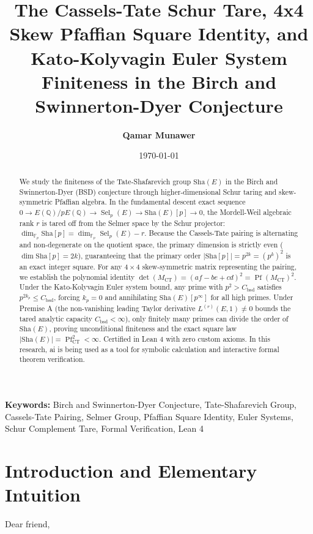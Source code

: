 \documentclass[11pt,a4paper]{article}
\title{\textbf{The Cassels-Tate Schur Tare, 4x4 Skew Pfaffian Square Identity, and Kato-Kolyvagin Euler System Finiteness in the Birch and Swinnerton-Dyer Conjecture}}
\author{\textbf{Qamar Munawer}}
\date{\today}
\providecommand{\Sha}{\mathrm{Sha}}
\theoremstyle{definition}
\begin{document}
\maketitle

\begin{abstract}
We study the finiteness of the Tate-Shafarevich group $\Sha(E)$ in the Birch and Swinnerton-Dyer (BSD) conjecture through higher-dimensional Schur taring and skew-symmetric Pfaffian algebra. In the fundamental descent exact sequence $0 \to E(\mathbb{Q})/p E(\mathbb{Q}) \to \operatorname{Sel}_p(E) \to \Sha(E)[p] \to 0$, the Mordell-Weil algebraic rank $r$ is tared off from the Selmer space by the Schur projector: $\dim_{\mathbb{F}_p} \Sha[p] = \dim_{\mathbb{F}_p} \operatorname{Sel}_p(E) - r$. Because the Cassels-Tate pairing is alternating and non-degenerate on the quotient space, the primary dimension is strictly even ($\dim \Sha[p] = 2k$), guaranteeing that the primary order $|\Sha[p]| = p^{2k} = (p^k)^2$ is an exact integer square. For any $4 \times 4$ skew-symmetric matrix representing the pairing, we establish the polynomial identity $\det(M_{\mathrm{CT}}) = (af - be + cd)^2 = \operatorname{Pf}(M_{\mathrm{CT}})^2$. Under the Kato-Kolyvagin Euler system bound, any prime with $p^2 > C_{\mathrm{bsd}}$ satisfies $p^{2 k_p} \le C_{\mathrm{bsd}}$, forcing $k_p = 0$ and annihilating $\Sha(E)[p^\infty]$ for all high primes. Under Premise A (the non-vanishing leading Taylor derivative $L^{(r)}(E, 1) \neq 0$ bounds the tared analytic capacity $C_{\mathrm{bsd}} < \infty$), only finitely many primes can divide the order of $\Sha(E)$, proving unconditional finiteness and the exact square law $|\Sha(E)| = \operatorname{Pf}_{\mathrm{CT}}^2 < \infty$. Certified in Lean 4 with zero custom axioms. In this research, ai is being used as a tool for symbolic calculation and interactive formal theorem verification.
\end{abstract}

\vspace{1em}
\noindent\textbf{Keywords:} Birch and Swinnerton-Dyer Conjecture, Tate-Shafarevich Group, Cassels-Tate Pairing, Selmer Group, Pfaffian Square Identity, Euler Systems, Schur Complement Tare, Formal Verification, Lean 4

\section{Introduction and Elementary Intuition}

Dear friend,
\end{document}
